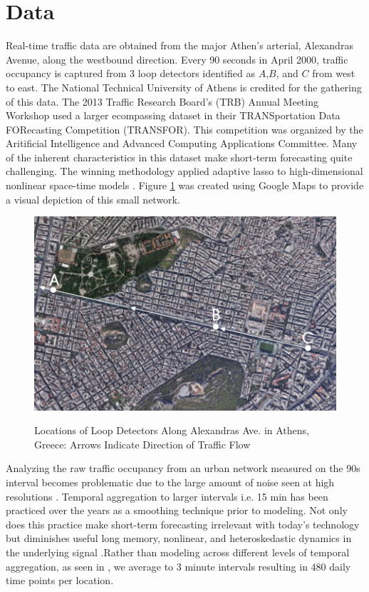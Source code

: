 \section{Data}
Real-time traffic data are obtained from the major Athen's arterial, Alexandras Avenue, along the westbound direction. Every 90 seconds in April 2000, traffic occupancy is captured from 3 loop detectors identified as $A$,$B$, and $C$ from west to east.  The National Technical University of Athens is credited for the gathering of this data. The 2013 Traffic Research Board's (TRB) Annual Meeting Workshop used a larger ecompassing dataset in their TRANSportation Data FORecasting Competition (TRANSFOR). This competition was organized by the Aritificial Intelligence and Advanced Computing Applications Committee.  Many of the inherent characteristics in this dataset make short-term forecasting quite challenging. The winning methodology applied adaptive lasso to high-dimensional nonlinear space-time models \citep{Kamarianakis2012}.   Figure \ref{fig:trafficdatamap} was created using Google Maps to provide a visual depiction of this small network.

\begin{figure}[!h]
\caption{Locations of Loop Detectors Along Alexandras Ave. in Athens, Greece: Arrows Indicate Direction of Traffic Flow}
\includegraphics[width=\textwidth]{TrafficMap}
\label{fig:trafficdatamap}
\end{figure}

Analyzing the raw traffic occupancy from an urban network measured on the 90s interval becomes problematic due to the large amount of noise seen at high resolutions \citep{Vlahogianni2014}. Temporal aggregation to larger intervals i.e. 15 min has been practiced over the years as a smoothing technique prior to modeling. Not only does this practice make short-term forecasting irrelevant with today's technology but diminishes useful long memory, nonlinear, and heteroskedastic dynamics in the underlying signal \cite{Vlahogianni2011}.Rather than modeling across different levels of temporal aggregation, as seen in \cite{Shang2006}, we average to 3 minute intervals resulting in 480 daily time points per location. 

